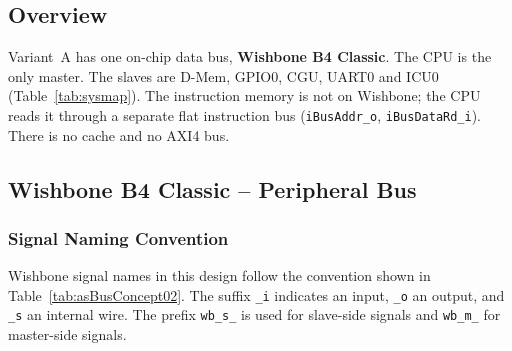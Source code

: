 
\subsection{Overview}

Variant~A has one on-chip data bus, \textbf{Wishbone B4 Classic}.
The CPU is the only master. The slaves are D-Mem, GPIO0, CGU, UART0 and ICU0
(Table~\ref{tab:sysmap}).
The instruction memory is not on Wishbone; the CPU reads it through a
separate flat instruction bus (\texttt{iBusAddr\_o}, \texttt{iBusDataRd\_i}).
There is no cache and no AXI4 bus.

\subsection{Wishbone B4 Classic -- Peripheral Bus}

\subsubsection{Signal Naming Convention}

Wishbone signal names in this design follow the convention shown in
Table~\ref{tab:asBusConcept02}.
The suffix \texttt{\_i} indicates an input, \texttt{\_o} an output,
and \texttt{\_s} an internal wire.
The prefix \texttt{wb\_s\_} is used for slave-side signals and
\texttt{wb\_m\_} for master-side signals.

